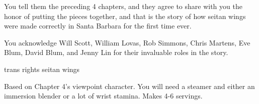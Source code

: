 \documentclass[12pt]{article}
\begin{document}
You tell them the preceding 4 chapters,
and they agree to share with you the honor of putting the pieces together,
and that is the story of how seitan wings were made correctly in Santa Barbara for the first time ever.

\vspace{24em}

\noindent You acknowledge Will Scott, William Lovas, Rob Simmons, Chris Martens, Eve Blum, David Blum, and Jenny Lin for their invaluable roles in the story.

\newpage \thispagestyle{empty}

\begin{center}
	{\sc \Large trans rights seitan wings}
\end{center}

Based on Chapter 4's viewpoint character.
You will need a steamer and either an immersion blender or a lot of wrist stamina.
Makes 4-6 servings.

\vspace{1em}
\end{document}
